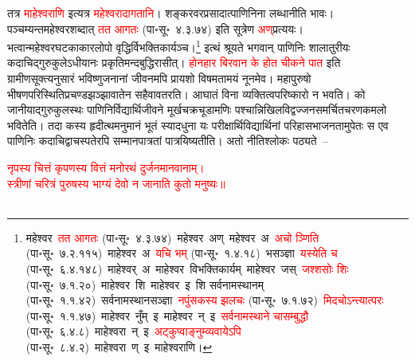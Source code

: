 \begin{sloppypar}\justifying\noindent\hspace{10mm} तत्र \textcolor{red}{माहेश्वराणि} इत्यत्र \textcolor{red}{महेश्वरादागतानि}।
शङ्कर\-वर\-प्रसादात्पाणिनिना लब्धानीति भावः। पञ्चम्यन्त\-महेश्वर\-शब्दात् \textcolor{red}{तत आगतः} (पा॰सू॰~४.३.७४) इति सूत्रेण \textcolor{red}{अण्‌}\-प्रत्ययः। भत्वान्महेश्वर\-घटकाकार\-लोपो वृद्धिर्विभक्ति\-कार्यञ्च।\footnote{महेश्वर~\arrow \textcolor{red}{तत आगतः} (पा॰सू॰~४.३.७४)~\arrow महेश्वर~अण्~\arrow महेश्वर~अ~\arrow \textcolor{red}{अचो ञ्णिति} (पा॰सू॰~७.२.११५)~\arrow माहेश्वर~अ~\arrow \textcolor{red}{यचि भम्} (पा॰सू॰~१.४.१८)~\arrow भसञ्ज्ञा~\arrow \textcolor{red}{यस्येति च} (पा॰सू॰~६.४.१४८)~\arrow माहेश्वर्~अ~\arrow माहेश्वर~\arrow विभक्ति\-कार्यम्~\arrow माहेश्वर~जस्~\arrow \textcolor{red}{जश्शसोः शिः} (पा॰सू॰~७.१.२०)~\arrow माहेश्वर~शि~\arrow माहेश्वर~इ~\arrow शि सर्वनामस्थानम् (पा॰सू॰~१.१.४२)~\arrow सर्वनामस्थान\-सञ्ज्ञा~\arrow \textcolor{red}{नपुंसकस्य झलचः} (पा॰सू॰~७.१.७२)~\arrow \textcolor{red}{मिदचोऽन्त्यात्परः} (पा॰सू॰~१.१.४७)~\arrow माहेश्वर~नुँम्~इ~\arrow माहेश्वर~न्~इ~\arrow \textcolor{red}{सर्वनामस्थाने चासम्बुद्धौ} (पा॰सू॰~६.४.८)~\arrow माहेश्वरा~न्~इ~\arrow \textcolor{red}{अट्कुप्वाङ्नुम्व्यवायेऽपि} (पा॰सू॰~८.४.२)~\arrow माहेश्वरा~ण्~इ~\arrow माहेश्वराणि।} इत्थं श्रूयते भगवान् पाणिनिः शालातुरीयः कदाचिद्गुरुकुलेऽधीयानः प्रकृति\-मन्द\-बुद्धिरासीत्। \textcolor{red}{होनहार बिरवान के होत चीकने पात} इति ग्रामीण\-सूक्त्यनुसारं भविष्णु\-जनानां जीवनमपि प्रायशो विषमतामयं नूनमेव। महा\-पुरुषो भीषण\-परिस्थिति\-प्रचण्ड\-झञ्झा\-वातेन सहैवावतरति। आघातं विना व्यक्तित्व\-परिष्कारो न भवति। को जानीयाद्गुरुकुलस्थः पाणिनिर्विद्यार्थि\-जीवने मूर्ख\-चक्र\-चूडामणिः पश्चान्निखिल\-विद्वज्जन\-समर्चित\-चरण\-कमलो भवितेति। तदा कस्य हृदीत्थमनुमानं भूतं स्यादधुना यः परीक्षार्थि\-विद्यार्थिनां परिहास\-भाजनतामुपेतः स एव पाणिनिः कदाचिद्वाचस्पतेरपि सम्मान\-पात्रतां पात्रयिष्यतीति। अतो नीतिश्लोकः पठ्यते~–\end{sloppypar}
\centering\textcolor{red}{नृपस्य चित्तं कृपणस्य वित्तं मनोरथं दुर्जनमानवानाम्।	\nopagebreak\\
स्त्रीणां चरित्रं पुरुषस्य भाग्यं देवो न जानाति कुतो मनुष्यः॥}\nopagebreak\\
\\
